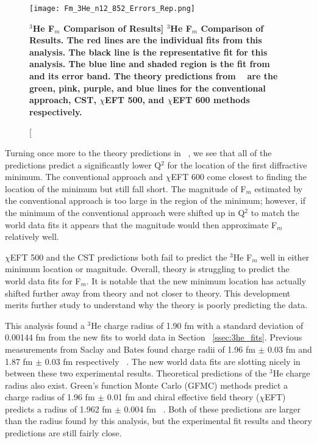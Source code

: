 \begin{figure}[!ht]
	\begin{center}
	\texttt{[image: Fm\_3He\_n12\_852\_Errors\_Rep.png]}
	\end{center}
	\caption[\bf{$^3$He F$_{m}$ Comparison of Results}]{
	{\bf{$^3$He F$_{m}$ Comparison of Results.}} The red lines are the individual fits from this analysis. The black line is the representative fit for this analysis. The blue line and shaded region is the fit from ~\cite{Article:Amroun} and its error band. The theory predictions from ~\cite{Article:Marcucci} are the green, pink, purple, and blue lines for the conventional approach, CST, $\chi$EFT 500, and $\chi$EFT 600 methods respectively.}
	\label{fig:3he_fm_theory}
\end{figure}

Turning once more to the theory predictions in ~\cite{Article:Marcucci}, we see that all of the predictions predict a significantly lower Q$^2$ for the location of the first diffractive minimum. The conventional approach and $\chi$EFT 600 come closest to finding the location of the minimum but still fall short. The magnitude of F$_m$ estimated by the conventional approach is too large in the region of the minimum; however, if the minimum of the conventional approach were shifted up in Q$^2$ to match the world data fits it appears that the magnitude would then approximate F$_m$ relatively well. 

$\chi$EFT 500 and the CST predictions both fail to predict the $^3$He F$_m$ well in either minimum location or magnitude. Overall, theory is struggling to predict the world data fits for F$_m$. It is notable that the new minimum location has actually shifted further away from theory and not closer to theory. This development merits further study to understand why the theory is poorly predicting the data. 

This analysis found a $^3$He charge radius of 1.90 fm with a standard deviation of 0.00144 fm from the new fits to world data in Section ~\ref{ssec:3he_fits}. Previous measurements from Saclay and Bates found charge radii of 1.96 fm $\pm$ 0.03 fm and 1.87 fm $\pm$ 0.03 fm respectively ~\cite{3h_proposal}. The new world data fits are slotting nicely in between these two experimental results. Theoretical predictions of the $^3$He charge radius also exist. Green's function Monte Carlo (GFMC) methods predict a charge radius of 1.96 fm $\pm$ 0.01 fm and chiral effective field theory ($\chi$EFT) predicts a radius of 1.962 fm $\pm$ 0.004 fm ~\cite{3h_proposal}. Both of these predictions are larger than the radius found by this analysis, but the experimental fit results and theory predictions are still fairly close.

